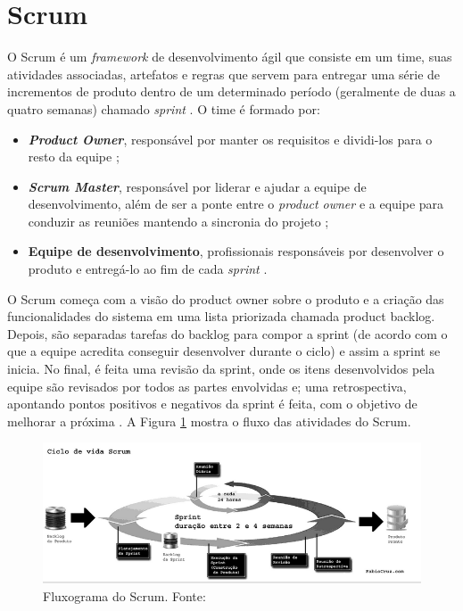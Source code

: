 \section{Scrum}

O Scrum é um \textit{framework} de desenvolvimento ágil que consiste em um time, suas atividades associadas, artefatos e regras que servem para entregar uma série de incrementos de produto dentro de um determinado período (geralmente de duas a quatro semanas) chamado \textit{sprint} \cite{livro-scrum}.
O time é formado por:
\begin{itemize}
\item \textbf{\textit{Product Owner}}, responsável por manter os requisitos e dividi-los para o resto da equipe \cite{product-owner};
\item \textbf{\textit{Scrum Master}}, responsável por liderar e ajudar a equipe de desenvolvimento, além de ser a ponte entre o \textit{product owner} e a equipe para conduzir as reuniões mantendo a sincronia do projeto \cite{scrum-master};
\item \textbf{Equipe de desenvolvimento}, profissionais responsáveis por desenvolver o produto e entregá-lo ao fim de cada \textit{sprint} \cite{equipe-dev}.
\end{itemize}
\pagebreak

O Scrum começa com a visão do product owner sobre o produto e a criação das funcionalidades do sistema em uma lista priorizada chamada product backlog. Depois, são separadas tarefas do backlog para compor a sprint (de acordo com o que a equipe acredita conseguir desenvolver durante o ciclo) e assim a sprint se inicia. No final, é feita uma revisão da sprint, onde os itens desenvolvidos pela equipe são revisados por todos as partes envolvidas e; uma retrospectiva, apontando pontos positivos e negativos da sprint é feita, com o objetivo de melhorar a próxima \cite{livro-scrum}. A Figura \ref{img:scrum} mostra o fluxo das atividades do Scrum.

\begin{figure}[H]
    \centering
    \includegraphics[scale=0.5]{figuras/scrum.png}
    \caption[Fluxograma do Scrum]{Fluxograma do Scrum. Fonte: \cite{artigo-scrum}}
    \label{img:scrum}
\end{figure}
